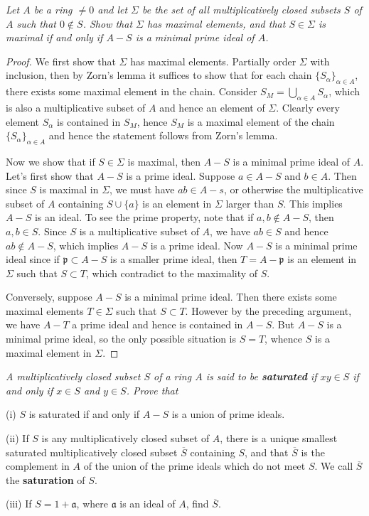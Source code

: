 \begin{problem}\em
Let $A$ be a ring $\ne 0$ and let $\Sigma$ be the set of all multiplicatively closed subsets $S$ of $A$ such that $0\notin S$. Show that $\Sigma$ has maximal elements, and that $S\in\Sigma$ is maximal if and only if $A-S$ is a minimal prime ideal of $A$.
\end{problem}
\begin{proof}
We first show that $\Sigma$ has maximal elements. Partially order $\Sigma$ with inclusion, then by Zorn's lemma it suffices to show that for each chain $\{S_\alpha\}_{\alpha\in A}$, there exists some maximal element in the chain. Consider $S_M=\bigcup_{\alpha\in A}S_\alpha$, which is also a multiplicative subset of $A$ and hence an element of $\Sigma$. Clearly every element $S_\alpha$ is contained in $S_M$, hence $S_M$ is a maximal element of the chain $\{S_\alpha\}_{\alpha\in A}$ and hence the statement follows from Zorn's lemma.\par
Now we show that if $S\in\Sigma$ is maximal, then $A-S$ is a minimal prime ideal of $A$. Let's first show that $A-S$ is a prime ideal. Suppose $a\in A-S$ and $b\in A$. Then since $S$ is maximal in $\Sigma$, we must have $ab\in A-s$, or otherwise the multiplicative subset of $A$ containing $S\cup\{a\}$ is an element in $\Sigma$ larger than $S$. This implies $A-S$ is an ideal. To see the prime property, note that if $a,b\notin A-S$, then $a,b\in S$. Since $S$ is a multiplicative subset of $A$, we have $ab\in S$ and hence $ab\notin A-S$, which implies $A-S$ is a prime ideal. Now $A-S$ is a minimal prime ideal since if $\mathfrak{p}\subset A-S$ is a smaller prime ideal, then $T=A-\mathfrak{p}$ is an element in $\Sigma$ such that $S\subset T$, which contradict to the maximality of $S$.\par
Conversely, suppose $A-S$ is a minimal prime ideal. Then there exists some maximal elements $T\in\Sigma$ such that $S\subset T$. However by the preceding argument, we have $A-T$ a prime ideal and hence is contained in $A-S$. But $A-S$ is a minimal prime ideal, so the only possible situation is $S=T$, whence $S$ is a maximal element in $\Sigma$.
\end{proof}
\begin{problem}\em
A multiplicatively closed subset $S$ of a ring $A$ is said to be \textbf{saturated} if $xy\in S$ if and only if $x\in S$ and $y\in S$. Prove that \par
(i) $S$ is saturated if and only if $A-S$ is a union of prime ideals.\par
(ii) If $S$ is any multiplicatively closed subset of $A$, there is a unique smallest saturated multiplicatively closed subset $\overline{S}$ containing $S$, and that $\overline{S}$ is the complement in $A$ of the union of the prime ideals which do not meet $S$. We call $\overline{S}$ the \textbf{saturation} of $S$.\par
(iii) If $S=1+\mathfrak{a}$, where $\mathfrak{a}$ is an ideal of $A$, find $\overline{S}$.
\end{problem}

